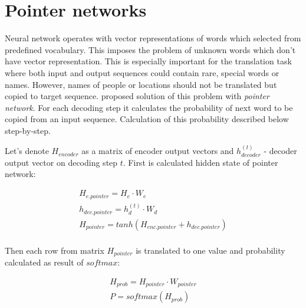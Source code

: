 \section{Pointer networks}
Neural network operates with vector representations of words which selected from predefined vocabulary. This imposes the problem of unknown words which don't have vector representation. This is especially important for the translation task where both input and output sequences could contain rare, special words or names. However, names of people or locations should not be translated but copied to target sequence. \cite{Vinyals2015} proposed solution of this problem with \emph{pointer network}. For each decoding step it calculates the probability of next word to be copied from an input sequence. Calculation of this probability described below step-by-step.

Let's denote $H_{encoder}$ as a matrix of encoder output vectors and $h_{decoder}^{(t)}$ - decoder output vector on decoding step $t$. First is calculated hidden state of pointer network:

\begin{equation}
    \begin{gathered}
    
    H_{e.pointer} = H_e \cdot W_{e}\\
    
    h_{dec.pointer} = h_{d}^{(t)} \cdot W_{d}\\
    
    H_{pointer} = tanh(H_{enc.pointer} + h_{dec.pointer})\\
    
    \end{gathered}
    \label{eq:pointer}
\end{equation}

Then each row from matrix $H_{pointer}$ is translated to one value and probability calculated as result of $softmax$:

\begin{equation}
    \begin{gathered}
    
    H_{prob} = H_{pointer} \cdot W_{pointer}\\
    
    P = softmax(H_{prob})\\
    
    \end{gathered}
\end{equation}


